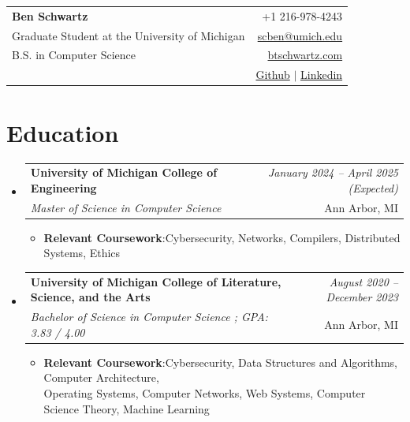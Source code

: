 \documentclass[a4paper,11pt]{article}
\makeatletter
\newcommand{\resumeItem}[2]{
  \item{
    \textbf{#1}{:\hspace{0.5mm}#2 \vspace{-0.5mm}}
  }
}
\newcommand{\resumeSubheading}[4]{
\vspace{0.5mm}\item
    \begin{tabular*}{0.98\textwidth}[t]{l@{\extracolsep{\fill}}r}
        \textbf{#1} & \textit{\footnotesize{#4}} \\
        \textit{\footnotesize{#3}} &  \footnotesize{#2}\\
    \end{tabular*}
    \vspace{-2.4mm}
}
\newcommand{\resumeSubItem}[2]{\resumeItem{#1}{#2}\vspace{-4pt}}
\newcommand{\resumeSubHeadingListStart}{\begin{itemize}[leftmargin=*,labelsep=0mm]}
\newcommand{\resumeItemListStart}{\begin{justify}\begin{itemize}[leftmargin=3ex, rightmargin=2ex, noitemsep,labelsep=1.2mm,itemsep=0mm]\small}
\newcommand{\resumeSubHeadingListEnd}{\end{itemize}\vspace{4mm}}
\newcommand{\resumeItemListEnd}{\end{itemize}\end{justify}\vspace{-5mm}}
\newcommand{\name}{Ben Schwartz} %
\newcommand{\phone}{216-978-4243} %
\newcommand{\emaila}{scben@umich.edu} %
\newcommand{\github}{btschwartz12} %
\newcommand{\website}{https://btschwartz.com} %
\newcommand{\linkedin}{https://www.linkedin.com/in/ben-schwartz-1b700b225} %
\makeatother
\begin{document}
\selectfont
\parbox{2.35cm}{%
}
\parbox{\dimexpr\linewidth-2.8cm\relax}{
\begin{tabularx}{\linewidth}{L r}
  \textbf{\LARGE \name} & +1 \phone\\
  {Graduate Student at the University of Michigan} & \href{mailto:\emaila}{\emaila} \\
  {B.S. in Computer Science} & \href{\website}{\textcolor{websiteColor}{btschwartz.com}}\\
  {} & \href{https://github.com/\github}{\textcolor{githubColor}{Github}} $|$ \href{\linkedin}{\textcolor{linkedinColor}{Linkedin}}\\
  
\end{tabularx}
\vspace{-8mm}
}



\section{Education}
  \resumeSubHeadingListStart
    \resumeSubheading
      {University of Michigan College of Engineering}{Ann Arbor, MI}
      {Master of Science in Computer Science}{January 2024 -- April 2025 (Expected)}
      \resumeItemListStart
      \resumeSubItem{Relevant Coursework}
            {Cybersecurity, Networks, Compilers, Distributed Systems, Ethics} 
        \resumeItemListEnd
    \vspace{2.5mm}
    \resumeSubheading
      {University of Michigan College of Literature, Science, and the Arts}{Ann Arbor, MI}
      {Bachelor of Science in Computer Science ;  GPA: 3.83 / 4.00}{August 2020 -- December 2023}
      \resumeItemListStart
      \resumeSubItem{Relevant Coursework}
            {Cybersecurity, Data Structures and Algorithms, Computer Architecture,\\Operating Systems,
          Computer Networks, Web Systems, Computer Science Theory, Machine Learning} 
        \resumeItemListEnd
  \resumeSubHeadingListEnd
  \vspace{-4.5mm}
\end{document}
